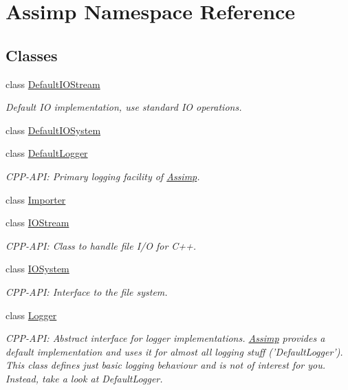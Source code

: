 \hypertarget{namespace_assimp}{
\section{Assimp Namespace Reference}
\label{namespace_assimp}
}


\subsection*{Classes}
\begin{CompactItemize}
\item 
class \hyperlink{class_assimp_1_1_default_i_o_stream}{DefaultIOStream}
\begin{CompactList}\small\item\em Default IO implementation, use standard IO operations. \item\end{CompactList}\item 
class \hyperlink{class_assimp_1_1_default_i_o_system}{DefaultIOSystem}
\item 
class \hyperlink{class_assimp_1_1_default_logger}{DefaultLogger}
\begin{CompactList}\small\item\em CPP-API: Primary logging facility of \hyperlink{namespace_assimp}{Assimp}. \item\end{CompactList}\item 
class \hyperlink{class_assimp_1_1_importer}{Importer}
\item 
class \hyperlink{class_assimp_1_1_i_o_stream}{IOStream}
\begin{CompactList}\small\item\em CPP-API: Class to handle file I/O for C++. \item\end{CompactList}\item 
class \hyperlink{class_assimp_1_1_i_o_system}{IOSystem}
\begin{CompactList}\small\item\em CPP-API: Interface to the file system. \item\end{CompactList}\item 
class \hyperlink{class_assimp_1_1_logger}{Logger}
\begin{CompactList}\small\item\em CPP-API: Abstract interface for logger implementations. \hyperlink{namespace_assimp}{Assimp} provides a default implementation and uses it for almost all logging stuff ('DefaultLogger'). This class defines just basic logging behaviour and is not of interest for you. Instead, take a look at DefaultLogger. \item\end{CompactList}\item 

\end{CompactItemize}
